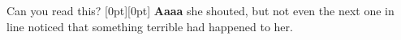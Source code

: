 \documentclass{article}
\begin{document}
\par
{}\par
{}\par
{}\par
{}Can you read this?
\newline
\raisebox{0pt}[0pt][0pt]{\Large%
\textbf{Aaaa\raisebox{-0.3ex}{a}%
\raisebox{-0.7ex}{aa}%
\raisebox{-1.2ex}{r}%
\raisebox{-2.2ex}{g}%
\raisebox{-4.5ex}{h}}}%
she shouted, but not even the next one in line noticed that something terrible had happened to her.
\end{document}
